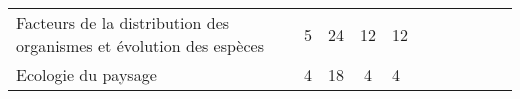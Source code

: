 \begin{tabular}{|m{5cm}|cm{0.75cm}|cm{0.75cm}|cm{0.75cm}|cm{0.75cm}|cm{0.75cm}|}
 \cellcolor{couleurClaire} \color{couleurTexte} Facteurs de la distribution des organismes et 
évolution des espèces & \cellcolor{couleurClaire} \color{couleurTexte} 5 & \cellcolor{couleurClaire} \color{couleurTexte} 24 & \cellcolor{couleurClaire} \color{couleurTexte} 12 & \cellcolor{couleurClaire} 12 
\\ \cline{1-5}

 \color{black} Ecologie du paysage & \color{black} 4 & \color{black} 18 & \color{black} 4 & \color{black} 4 \\ \cline{1-5}


\end{tabular}

